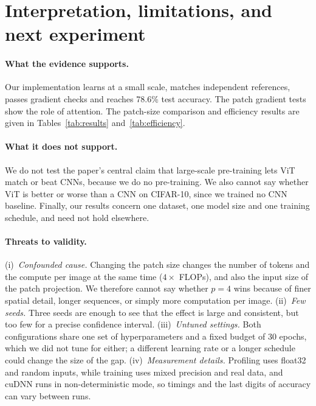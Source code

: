 \documentclass{article}
\begin{document}
\section{Interpretation, limitations, and next experiment}

\label{sec:limitations}

\paragraph{What the evidence supports.}
Our implementation learns at a small scale, matches independent references, passes gradient checks and reaches 78.6\% test accuracy. The patch gradient tests show the role of attention. The patch-size comparison and efficiency results are given in Tables~\ref{tab:results} and~\ref{tab:efficiency}.

\paragraph{What it does not support.}
We do not test the paper's central claim that large-scale pre-training lets
ViT match or beat CNNs, because we do no pre-training. We also cannot say
whether ViT is better or worse than a CNN on CIFAR-10, since we trained no
CNN baseline. Finally, our results concern one dataset, one model size and one training
schedule, and need not hold elsewhere.

\paragraph{Threats to validity.}
(i)~\emph{Confounded cause.} Changing the patch size changes the number of
tokens and the compute per image at the same time ($4\times$ FLOPs), and
also the input size of the patch projection. We therefore cannot say
whether $p{=}4$ wins because of finer spatial detail, longer sequences, or
simply more computation per image.
(ii)~\emph{Few seeds.} Three seeds are enough to see that the effect is
large and consistent, but too few for a precise confidence interval.
(iii)~\emph{Untuned settings.} Both configurations share one set of
hyperparameters and a fixed budget of 30 epochs, which we did not tune for
either; a different learning rate or a longer schedule could change the
size of the gap.
(iv)~\emph{Measurement details.} Profiling uses float32 and random inputs,
while training uses mixed precision and real data, and cuDNN runs in
non-deterministic mode, so timings and the last digits of accuracy can
vary between runs.
\end{document}
